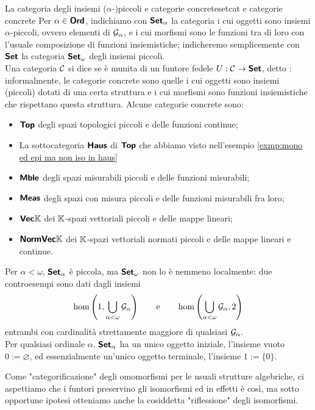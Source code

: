 \documentclass[openany]{book}
\renewcommand\C{\mc{C}}
\begin{document}
\begin{example}{La categoria degli insiemi ($\alpha$-)piccoli e categorie concrete}{setcat e categorie concrete}
    Per $\alpha \in \text{\sffamily\textbf{Ord}}$, indichiamo con $\text{\sffamily\textbf{Set}}_\alpha$ la categoria i cui oggetti sono insiemi $\alpha$-piccoli, ovvero elementi di $\mathcal{G}_\alpha$, e i cui morfismi sono le funzioni tra di loro con l'usuale composizione di funzioni insiemistiche; indicheremo semplicemente con $\text{\sffamily\textbf{Set}}$ la categoria $\text{\sffamily\textbf{Set}}_\omega$ degli insiemi piccoli.\\
    Una categoria $\C$ si dice  se è munita di un funtore fedele $U:\C\to\setcat$, detto : informalmente, le categorie concrete sono quelle i cui oggetti sono insiemi (piccoli) dotati di una certa struttura e i cui morfismi sono funzioni insiemistiche che rispettano questa struttura. Alcune categorie concrete sono:\begin{itemize}
        \item $\text{\sffamily\textbf{Top}}$ degli spazi topologici piccoli e delle funzioni continue;
        \item La sottocategoria $\text{\sffamily\textbf{Haus}}$ di $\text{\sffamily\textbf{Top}}$ che abbiamo visto nell'esempio \cref{exmp:mono ed epi ma non iso in haus}
        \item $\text{\sffamily\textbf{Mble}}$ degli spazi misurabili piccoli e delle funzioni misurabili;
        \item $\text{\sffamily\textbf{Meas}}$ degli spazi con misura piccoli e delle funzioni misurabili fra loro;
        \item $\text{\sffamily\textbf{Vec}}\mathbb{K}$ dei $\mathbb{K}$-spazi vettoriali piccoli e delle mappe lineari;
        \item $\text{\sffamily\textbf{NormVec}}\mathbb{K}$ dei $\mathbb{K}$-spazi vettoriali normati piccoli e delle mappe lineari e continue.
    \end{itemize}
    Per $\alpha <\omega$, $\text{\sffamily\textbf{Set}}_\alpha$ è piccola, ma $\text{\sffamily\textbf{Set}}_\omega$ non lo è nemmeno localmente: due controesempi sono dati dagli insiemi
    \[ \hom\left(1,\bigcup_{\alpha < \omega}\mathcal{G}_\alpha\right)\qquad \text{e} \qquad \hom\left(\bigcup_{\alpha < \omega}\mathcal{G}_\alpha, 2 \right)\]
    entrambi con cardinalità strettamente maggiore di qualsiasi $\mathcal{G}_\alpha$.\\
    Per qualsiasi ordinale $\alpha$, $\text{\sffamily\textbf{Set}}_\alpha$ ha un unico oggetto iniziale, l'insieme vuoto $0:= \varnothing$, ed essenzialmente un'unico oggetto terminale, l'insieme $1:= \{0\}$.
\end{example}

Come "categorificazione" degli omomorfismi per le usuali strutture algebriche, ci aspettiamo che i funtori preservino gli isomorfismi ed in effetti è così, ma sotto opportune ipotesi otteniamo anche la cosiddetta "riflessione" degli isomorfismi.
\end{document}
